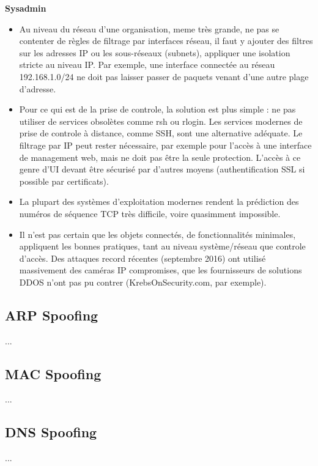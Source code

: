 \begin{tabbing}
\end{tabbing}
\textbf{Sysadmin}
\begin{itemize}
\item Au niveau du réseau d'une organisation, meme très grande, ne pas se contenter de règles de filtrage par interfaces réseau, il faut y ajouter des filtres sur les adresses IP ou les sous-réseaux (subnets), appliquer une isolation stricte au niveau IP. Par exemple, une interface connectée au réseau 192.168.1.0/24 ne doit pas laisser passer de paquets venant d'une autre plage d'adresse.
\item Pour ce qui est de la prise de controle, la solution est plus simple : ne pas utiliser de services obsolètes comme rsh ou rlogin. Les services modernes de prise de controle à distance, comme SSH, sont une alternative adéquate. Le filtrage par IP peut rester nécessaire, par exemple pour l'accès à une interface de management web, mais ne doit pas être la seule protection. L'accès à ce genre d'UI devant être sécurisé par d'autres moyens (authentification SSL si possible par certificats).
\item La plupart des systèmes d'exploitation modernes rendent la prédiction des numéros de séquence TCP très difficile, voire quasimment impossible.
\item Il n'est pas certain que les objets connectés, de fonctionnalités minimales, appliquent les bonnes pratiques, tant au niveau système/réseau que controle d'accès. Des attaques record récentes (septembre 2016) ont utilisé massivement des caméras IP compromises, que les fournisseurs de solutions DDOS n'ont pas pu contrer (KrebsOnSecurity.com, par exemple).
\end{itemize}
\begin{tabbing}
\end{tabbing}



\subsection{ARP Spoofing}\label{vulnerabilites:reseau:spoofing:arp}

...

\subsection{MAC Spoofing}\label{vulnerabilites:reseau:spoofing:mac}

...

\subsection{DNS Spoofing}\label{vulnerabilites:reseau:spoofing:dns}

...

\endinput
